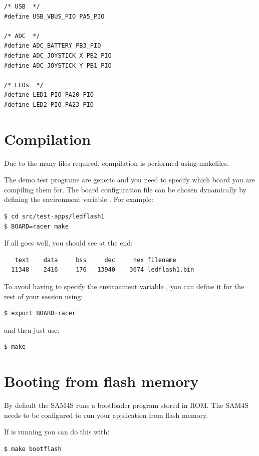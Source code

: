 \begin{verbatim}
/* USB  */
#define USB_VBUS_PIO PA5_PIO

/* ADC  */
#define ADC_BATTERY PB3_PIO
#define ADC_JOYSTICK_X PB2_PIO
#define ADC_JOYSTICK_Y PB1_PIO

/* LEDs  */
#define LED1_PIO PA20_PIO
#define LED2_PIO PA23_PIO
\end{verbatim}


\section{Compilation}
\label{compilation}

Due to the many files required, compilation is performed using
makefiles.

The demo test programs are generic and you need to specify which board
you are compiling them for. The board configuration file can be chosen
dynamically by defining the environment variable . For
example:
%
\begin{verbatim}
$ cd src/test-apps/ledflash1
$ BOARD=racer make
\end{verbatim}

If all goes well, you should see at the end:
%
\begin{verbatim}
   text    data     bss     dec     hex filename
  11348	   2416	    176	  13940	   3674	ledflash1.bin
\end{verbatim}

To avoid having to specify the environment variable , you
can define it for the rest of your session using:
%
\begin{verbatim}
$ export BOARD=racer
\end{verbatim}
%
and then just use:
%
\begin{verbatim}
$ make
\end{verbatim}

\section{Booting from flash memory}
\label{booting-from-flash-memory}

By default the SAM4S runs a bootloader program stored in ROM. The SAM4S
needs to be configured to run your application from flash memory.

If  is running you can do this with:

\begin{verbatim}
$ make bootflash
\end{verbatim}

